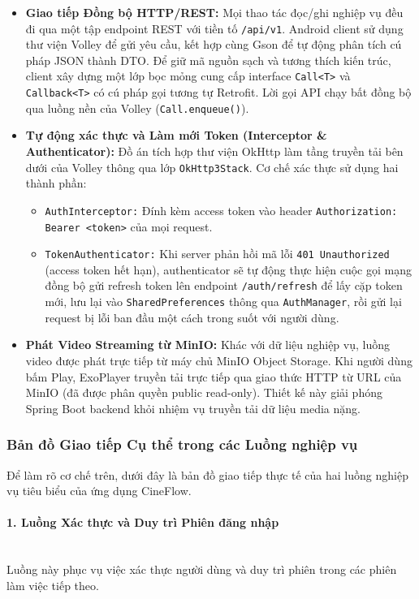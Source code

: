 \begin{itemize}
  \item \textbf{Giao tiếp Đồng bộ HTTP/REST:} Mọi thao tác đọc/ghi nghiệp vụ đều đi
  qua một tập endpoint REST với tiền tố \texttt{/api/v1}. Android client sử dụng thư viện
  Volley để gửi yêu cầu, kết hợp cùng Gson để tự động phân tích cú pháp JSON thành DTO.
  Để giữ mã nguồn sạch và tương thích kiến trúc, client xây dựng một lớp bọc mỏng
  cung cấp interface \texttt{Call<T>} và \texttt{Callback<T>} có cú pháp gọi tương tự
  Retrofit. Lời gọi API chạy bất đồng bộ qua luồng nền của Volley (\texttt{Call.enqueue()}).

  \item \textbf{Tự động xác thực và Làm mới Token (Interceptor \& Authenticator):}
  Đồ án tích hợp thư viện OkHttp làm tầng truyền tải bên dưới của Volley thông qua
  lớp \texttt{OkHttp3Stack}. Cơ chế xác thực sử dụng hai thành phần:
  \begin{itemize}
    \item \texttt{AuthInterceptor:} Đính kèm access token vào header \texttt{Authorization: Bearer <token>} của mọi request.
    \item \texttt{TokenAuthenticator:} Khi server phản hồi mã lỗi \texttt{401 Unauthorized} (access token hết hạn), authenticator sẽ tự động thực hiện cuộc gọi mạng đồng bộ gửi refresh token lên endpoint \texttt{/auth/refresh} để lấy cặp token mới, lưu lại vào \texttt{SharedPreferences} thông qua \texttt{AuthManager}, rồi gửi lại request bị lỗi ban đầu một cách trong suốt với người dùng.
  \end{itemize}

  \item \textbf{Phát Video Streaming từ MinIO:} Khác với dữ liệu nghiệp
  vụ, luồng video được phát trực tiếp từ máy chủ MinIO Object Storage. Khi người dùng bấm Play,
  ExoPlayer truyền tải trực tiếp qua giao thức HTTP từ URL của MinIO (đã được phân quyền public read-only).
  Thiết kế này giải phóng Spring Boot backend khỏi nhiệm vụ truyền tải dữ liệu media nặng.
\end{itemize}

\subsubsection{Bản đồ Giao tiếp Cụ thể trong các Luồng nghiệp vụ}
Để làm rõ cơ chế trên, dưới đây là bản đồ giao tiếp thực tế của hai luồng nghiệp
vụ tiêu biểu của ứng dụng CineFlow.

\paragraph{1. Luồng Xác thực và Duy trì Phiên đăng nhập}
\mbox{}\\
Luồng này phục vụ việc xác thực người dùng và duy trì phiên trong các phiên làm
việc tiếp theo.

